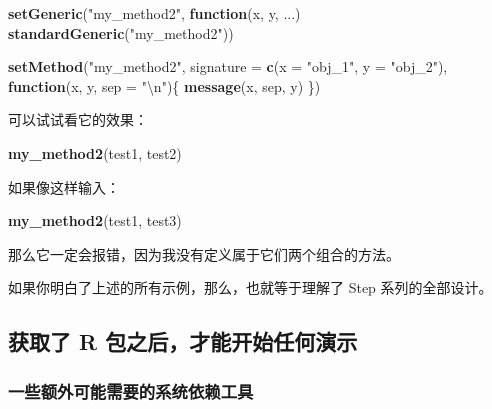 \documentclass[
]{article}
\newenvironment{Shaded}{\begin{snugshade}}{\end{snugshade}}
\newcommand{\CharTok}[1]{\textcolor[rgb]{0.31,0.60,0.02}{#1}}
\newcommand{\ControlFlowTok}[1]{\textcolor[rgb]{0.13,0.29,0.53}{\textbf{#1}}}
\newcommand{\DataTypeTok}[1]{\textcolor[rgb]{0.13,0.29,0.53}{#1}}
\newcommand{\KeywordTok}[1]{\textcolor[rgb]{0.13,0.29,0.53}{\textbf{#1}}}
\newcommand{\NormalTok}[1]{#1}
\newcommand{\StringTok}[1]{\textcolor[rgb]{0.31,0.60,0.02}{#1}}
\begin{document}
\begin{Shaded}
\begin{Highlighting}[]
\KeywordTok{setGeneric}\NormalTok{(}\StringTok{"my\_method2"}\NormalTok{, }\ControlFlowTok{function}\NormalTok{(x, y, ...) }\KeywordTok{standardGeneric}\NormalTok{(}\StringTok{"my\_method2"}\NormalTok{))}

\KeywordTok{setMethod}\NormalTok{(}\StringTok{"my\_method2"}\NormalTok{, }\DataTypeTok{signature =} \KeywordTok{c}\NormalTok{(}\DataTypeTok{x =} \StringTok{"obj\_1"}\NormalTok{, }\DataTypeTok{y =} \StringTok{"obj\_2"}\NormalTok{),}
  \ControlFlowTok{function}\NormalTok{(x, y, }\DataTypeTok{sep =} \StringTok{"}\CharTok{\textbackslash{}n}\StringTok{"}\NormalTok{)\{}
    \KeywordTok{message}\NormalTok{(x, sep, y)}
\NormalTok{  \})}
\end{Highlighting}
\end{Shaded}

可以试试看它的效果：

\begin{Shaded}
\begin{Highlighting}[]
\KeywordTok{my\_method2}\NormalTok{(test1, test2)}
\end{Highlighting}
\end{Shaded}

如果像这样输入：

\begin{Shaded}
\begin{Highlighting}[]
\KeywordTok{my\_method2}\NormalTok{(test1, test3)}
\end{Highlighting}
\end{Shaded}

那么它一定会报错，因为我没有定义属于它们两个组合的方法。

如果你明白了上述的所有示例，那么，也就等于理解了 Step 系列的全部设计。

\hypertarget{ux83b7ux53d6ux4e86-r-ux5305ux4e4bux540eux624dux80fdux5f00ux59cbux4efbux4f55ux6f14ux793a}{%
\subsection{获取了 R 包之后，才能开始任何演示}\label{ux83b7ux53d6ux4e86-r-ux5305ux4e4bux540eux624dux80fdux5f00ux59cbux4efbux4f55ux6f14ux793a}}

\hypertarget{ux4e00ux4e9bux989dux5916ux53efux80fdux9700ux8981ux7684ux7cfbux7edfux4f9dux8d56ux5de5ux5177}{%
\subsubsection{一些额外可能需要的系统依赖工具}\label{ux4e00ux4e9bux989dux5916ux53efux80fdux9700ux8981ux7684ux7cfbux7edfux4f9dux8d56ux5de5ux5177}}
\end{document}
